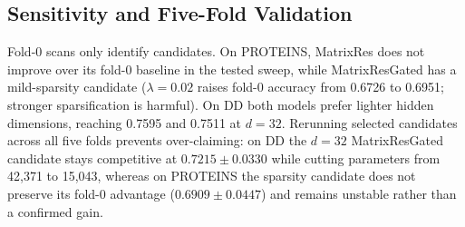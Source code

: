 \subsection{Sensitivity and Five-Fold Validation}
\label{sec:res-sensitivity}

Fold-0 scans only identify candidates. On PROTEINS, MatrixRes does not improve
over its fold-0 baseline in the tested sweep, while MatrixResGated has a
mild-sparsity candidate (\(\lambda=0.02\) raises fold-0 accuracy from 0.6726 to
0.6951; stronger sparsification is harmful). On DD both models prefer lighter
hidden dimensions, reaching 0.7595 and 0.7511 at \(d=32\). Rerunning selected
candidates across all five folds prevents over-claiming: on DD the \(d=32\)
MatrixResGated candidate stays competitive at \(0.7215\pm0.0330\) while cutting
parameters from 42{,}371 to 15{,}043, whereas on PROTEINS the sparsity candidate
does not preserve its fold-0 advantage (\(0.6909\pm0.0447\)) and remains
unstable rather than a confirmed gain.
